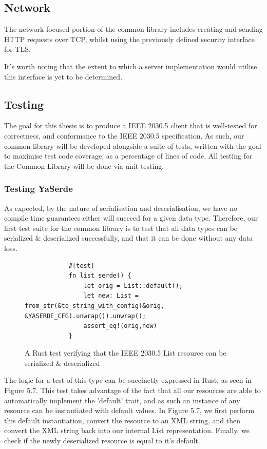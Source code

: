 \subsection{Network}
The network-focused portion of the common library includes creating and sending HTTP requests over TCP, whilst using the previously defined security interface for TLS.

It's worth noting that the extent to which a server implementation would utilise this interface is yet to be determined.


\subsection{Testing}
The goal for this thesis is to produce a IEEE 2030.5 client that is well-tested for correctness, and conformance to the IEEE 2030.5 specification.
As such, our common library will be developed alongside a suite of tests, written with the goal to maximise test code coverage, as a percentage of lines of code.
All testing for the Common Library will be done via unit testing.

\subsubsection{Testing YaSerde}
As expected, by the nature of serialisation and deserialisation, we have no compile time guarantees either will succeed for a given data type.
Therefore, our first test suite for the common library is to test that all data types can be serialized \& deserialized successfully, and that it can be done without any data loss.

\begin{figure}[h]
    \begin{center}
        \begin{lstlisting}
            #[test]
            fn list_serde() {
                let orig = List::default();
                let new: List = from_str(&to_string_with_config(&orig, &YASERDE_CFG).unwrap()).unwrap();
                assert_eq!(orig,new)
            }
        \end{lstlisting}
        \label{fig:yaserdetest}
        \vspace{-10pt}
        \caption{A Rust test verifying that the IEEE 2030.5 List resource can be serialized \& deserialized}
    \end{center}
\end{figure}

The logic for a test of this type can be succinctly expressed in Rust, as seen in Figure 5.7. 
This test takes advantage of the fact that all our resources are able to automatically implement the 'default' trait, and as such an instance of any resource can be instantiated with default values.
In Figure 5.7, we first perform this default instantiation, convert the resource to an XML string, and then convert the XML string back into our internal List representation. 
Finally, we check if the newly deserialized resource is equal to it's default.


